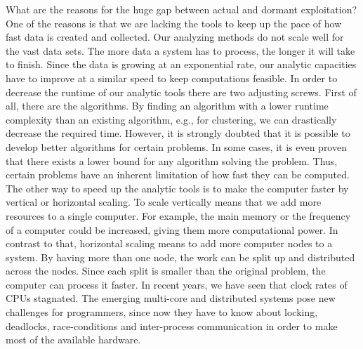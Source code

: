 What are the reasons for the huge gap between actual and dormant exploitation?
One of the reasons is that we are lacking the tools to keep up the pace of how fast data is created and collected.
Our analyzing methods do not scale well for the vast data sets.
The more data a system has to process, the longer it will take to finish.
Since the data is growing at an exponential rate, our analytic capacities have to improve at a similar speed to keep computations feasible. In order to decrease the runtime of our analytic tools there are two adjusting screws. First of all, there are the algorithms.
By finding an algorithm with a lower runtime complexity than an existing algorithm, e.g., for clustering, we can drastically decrease the required time. However, it is strongly doubted that it is possible to develop better algorithms for certain problems.
In some cases, it is even proven that there exists a lower bound for any algorithm solving the problem.
Thus, certain problems have an inherent limitation of how fast they can be computed. The other way to speed up the analytic tools is to make the computer faster by vertical or horizontal scaling. To scale vertically means that we add more resources to a single computer.
For example, the main memory or the frequency of a computer could be increased, giving them more computational power.
In contrast to that, horizontal scaling means to add more computer nodes to a system.
By having more than one node, the work can be split up and distributed across the nodes.
Since each split is smaller than the original problem, the computer can process it faster. In recent years, we have seen that clock rates of CPUs stagnated.
The emerging multi-core and distributed systems pose new challenges for programmers, since now they have to know about locking, deadlocks, race-conditions and inter-process communication in order to make most of the available hardware.
